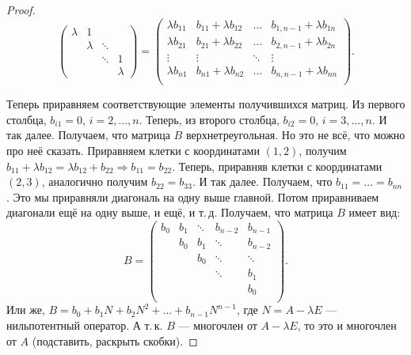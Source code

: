 \begin{proof}
\[\begin{pmatrix}
        \lambda & 1 & & \\
         & \lambda & \ddots & \\
         & & \ddots & 1 \\
         & & & \lambda
    \end{pmatrix} =
    \begin{pmatrix}
        \lambda b_{11} & b_{11} + \lambda b_{12} & \ldots & b_{1, n - 1} + \lambda b_{1n}\\
        \lambda b_{21} & b_{21} + \lambda b_{22} & \ldots & b_{2, n - 1} + \lambda b_{2n}\\
        \vdots & \vdots & \ddots & \vdots\\
        \lambda b_{n1} & b_{n1} + \lambda b_{n2} & \ldots & b_{n, n - 1} + \lambda b_{nn}\\
    \end{pmatrix}.
    \]

    Теперь приравняем соответствующие элементы получившихся матриц. Из первого столбца, $b_{i1} = 0$, $i = 2, \ldots, n$. Теперь, из второго столбца, $b_{i2} = 0$, $i = 3, \ldots, n$. И так далее. Получаем, что матрица $B$ верхнетреугольная. Но это не всё, что можно про неё сказать. Приравняем клетки с координатами $(1, 2)$, получим $b_{11} + \lambda b_{12} = \lambda b_{12} + b_{22} \Rightarrow b_{11} = b_{22}$. Теперь, приравняв клетки с координатами $(2, 3)$, аналогично получим $b_{22} = b_{33}$. И так далее. Получаем, что $b_{11} = \ldots = b_{nn}$. Это мы приравняли диагональ на одну выше главной. Потом приравниваем диагонали ещё на одну выше, и ещё, и т.\,д. Получаем, что матрица $B$ имеет вид:
    \[
        B =
        \begin{pmatrix}
            b_0 & b_1 & \ddots & b_{n - 2} & b_{n - 1}\\
                & b_0 & b_1 & \ddots & b_{n - 2}\\
                &     & b_0    & \ddots & \ddots\\
                &     &        & \ddots & b_1\\
                &     &        &        & b_0\\
        \end{pmatrix}.
    \]
    Или же, $B = b_0 + b_1N + b_2N^2 + \ldots + b_{n - 1}N^{n - 1}$, где $N = A - \lambda E$ --- нильпотентный оператор. А т.\,к. $B$ --- многочлен от $A - \lambda E$, то это и многочлен от $A$ (подставить, раскрыть скобки).
\end{proof}

